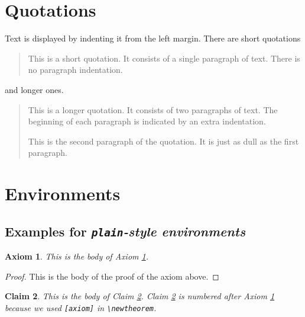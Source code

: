 \documentclass[aoas]{imsart}
\numberwithin{equation}{section}
\theoremstyle{plain}
\newtheorem{axiom}{Axiom}
\newtheorem{claim}[axiom]{Claim}
\theoremstyle{remark}
\begin{document}
\hypertarget{quotations}{%
\section{Quotations}\label{quotations}}

Text is displayed by indenting it from the left margin. There are short
quotations

\begin{quote}
This is a short quotation. It consists of a single paragraph of text.
There is no paragraph indentation.
\end{quote}

and longer ones.

\begin{quotation}
This is a longer quotation. It consists of two paragraphs of text. The
beginning of each paragraph is indicated by an extra indentation.

This is the second paragraph of the quotation. It is just as dull as the
first paragraph.

\end{quotation}

\hypertarget{environments}{%
\section{Environments}\label{environments}}

\hypertarget{examples-for-plain-style-environments}{%
\subsection{\texorpdfstring{Examples for \emph{\texttt{plain}-style
environments}}{Examples for plain-style environments}}\label{examples-for-plain-style-environments}}

\begin{axiom}
\label{ax1} This is the body of Axiom \ref{ax1}.

\end{axiom}

\begin{proof}
This is the body of the proof of the axiom above.

\end{proof}

\begin{claim}
\label{cl1} This is the body of Claim \ref{cl1}. Claim \ref{cl1} is
numbered after Axiom \ref{ax1} because we used \verb|[axiom]| in
\verb|\newtheorem|.

\end{claim}
\end{document}
